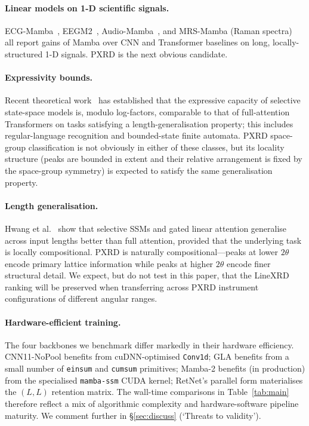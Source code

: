 \documentclass[final]{ws-ijwmip}
\begin{document}
\paragraph{Linear models on 1-D scientific signals.}
ECG-Mamba~\cite{anonymous2025ecgmamba}, EEGM2~\cite{anonymous2025eegm2},
Audio-Mamba~\cite{erol2024audiomamba}, and MRS-Mamba (Raman
spectra)~\cite{anonymous2025mrsmamba} all report gains of Mamba over CNN
and Transformer baselines on long, locally-structured 1-D signals. PXRD
is the next obvious candidate.

\paragraph{Expressivity bounds.}
Recent theoretical work~\cite{merrill2024expressivity,grazzi2024is} has
established that the expressive capacity of selective state-space
models is, modulo log-factors, comparable to that of full-attention
Transformers on tasks satisfying a length-generalisation property; this
includes regular-language recognition and bounded-state finite automata.
PXRD space-group classification is not obviously in either of these
classes, but its locality structure (peaks are bounded in extent and
their relative arrangement is fixed by the space-group symmetry) is
expected to satisfy the same generalisation property.

\paragraph{Length generalisation.}
Hwang et al.~\cite{hwang2025length} show that selective SSMs and
gated linear attention generalise across input lengths better than
full attention,
provided that the underlying task is locally compositional. PXRD is
naturally compositional---peaks at lower $2\theta$ encode primary
lattice information while peaks at higher $2\theta$ encode finer
structural detail. We expect, but do not test in this paper, that the
LineXRD ranking will be preserved when transferring across PXRD
instrument configurations of different angular ranges.

\paragraph{Hardware-efficient training.}
The four backbones we benchmark differ markedly in their hardware
efficiency. CNN11-NoPool benefits from cuDNN-optimised
\texttt{Conv1d}; GLA benefits from a small number of \texttt{einsum}
and \texttt{cumsum} primitives; Mamba-2 benefits (in production) from
the specialised \texttt{mamba-ssm} CUDA kernel; RetNet's parallel form
materialises the $(L,L)$ retention matrix. The wall-time comparisons in
Table~\ref{tab:main} therefore reflect a mix of algorithmic complexity
and hardware-software pipeline maturity. We comment further in
\S\ref{sec:discuss} (`Threats to validity').
\end{document}
